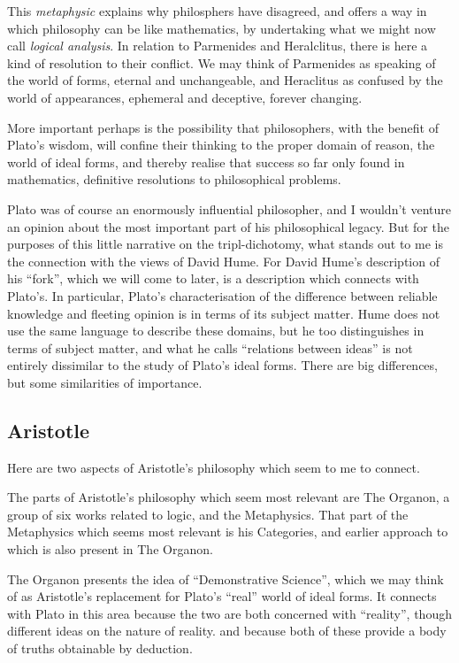 \documentclass[10pt,titlepage]{article}
\begin{document}
This \emph{metaphysic} explains why philosphers have disagreed, and offers a way in which philosophy can be like mathematics, by undertaking what we might now call \emph{logical analysis}.
In relation to Parmenides and Heralclitus, there is here a kind of resolution to their conflict.
We may think of Parmenides as speaking of the world of forms, eternal and unchangeable, and Heraclitus as confused by the world of appearances, ephemeral and deceptive, forever changing.

More important perhaps is the possibility that philosophers, with the benefit of Plato's wisdom, will confine their thinking to the proper domain of reason, the world of ideal forms, and thereby realise that success so far only found in mathematics, definitive resolutions to philosophical problems.

Plato was of course an enormously influential philosopher, and I wouldn't venture an opinion about the most important part of his philosophical legacy.
But for the purposes of this little narrative on the tripl-dichotomy, what stands out to me is the connection with the views of David Hume.
For David Hume's description of his ``fork'', which we will come to later, is a description which connects with Plato's.
In particular, Plato's characterisation of the difference between reliable knowledge and fleeting opinion is in terms of its subject matter.
Hume does not use the same language to describe these domains, but he too distinguishes in terms of subject matter, and what he calls ``relations between ideas'' is not entirely dissimilar to the study of Plato's ideal forms.
There are big differences, but some similarities of importance.

\subsection{Aristotle}

Here are two aspects of Aristotle's philosophy which seem to me to connect.

The parts of Aristotle's philosophy which seem most relevant are The Organon, a group of six works related to logic, and the Metaphysics.
That part of the Metaphysics which seems most relevant is his Categories, and earlier approach to which is also present in The Organon.

The Organon presents the idea of ``Demonstrative Science'', which we may think of as Aristotle's replacement for Plato's ``real'' world of ideal forms.
It connects with Plato in this area because the two are both concerned with ``reality'', though different ideas on the nature of reality. and because both of these provide a body of truths obtainable by deduction.
\end{document}
